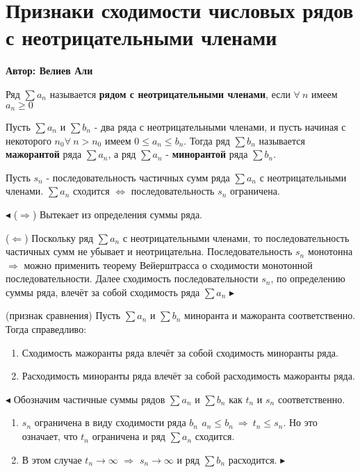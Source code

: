 \chapter{Признаки сходимости числовых рядов с неотрицательными членами}
\centerline{ \bf Автор: Велиев Али} \vskip 1cm

\begin{object}
Ряд $\sum{a_n}$ называется \textbf{рядом с неотрицательными членами}, если $\forall\ n$ имеем $a_n\ge0$
\end{object}


\begin{object}
Пусть $\sum{a_n}$ и $\sum{b_n}$ - два ряда с неотрицательными членами, и пусть начиная с некоторого $n_0 \forall\ n>n_0$ имеем $0\le{a_n}\le{b_n}$. Тогда ряд $\sum{b_n}$ называется \textbf{мажорантой} ряда $\sum{a_n}$, а ряд $\sum{a_n}$ - \textbf{минорантой} ряда $\sum{b_n}$.
\end{object}


\begin{theorem}
\label{aw}
Пусть $s_n$ - последовательность частичных сумм ряда $\sum{a_n}$ с неотрицательными членами. $\sum{a_n}$ сходится $\Leftrightarrow$ последовательность $s_n$ ограничена.
\end{theorem}
$\blacktriangleleft$ ($\Rightarrow$) Вытекает из определения суммы ряда.
\par ($\Leftarrow$) Поскольку ряд $\sum{a_n}$ с неотрицательными членами, то последовательность частичных сумм не убывает и неотрицательна. Последовательность $s_n$ монотонна $\Rightarrow$ можно применить теорему Вейерштрасса о сходимости  монотонной последовательности. Далее сходимость последовательности $s_n$, по определению суммы ряда, влечёт за собой сходимость ряда $\sum{a_n}$ $\blacktriangleright$


\begin{theorem}(признак сравнения)
Пусть $\sum{a_n}$ и $\sum{b_n}$ миноранта и мажоранта соответственно. Тогда справедливо:
\begin{enumerate}
\item Сходимость мажоранты ряда влечёт за собой сходимость миноранты ряда.
\item Расходимость миноранты ряда влечёт за собой расходимость мажоранты ряда.
\end{enumerate}
\end{theorem}
$\blacktriangleleft$ Обозначим частичные суммы рядов $\sum{a_n}$ и $\sum{b_n}$ как ${t_n}$ и ${s_n}$ соответственно.
\begin{enumerate}
\item $s_n$ ограничена в виду сходимости ряда $b_n\,\ a_n\le{b_n}\ \Rightarrow\ t_n\le{s_n}$. Но это означает, что $t_n$ ограничена и ряд $\sum{a_n}$ сходится.
\item В этом случае $t_n\to{\infty}$ $\Rightarrow$ $s_n\to{\infty}$ и ряд $\sum{b_n}$ расходится. $\blacktriangleright$
\end{enumerate}


